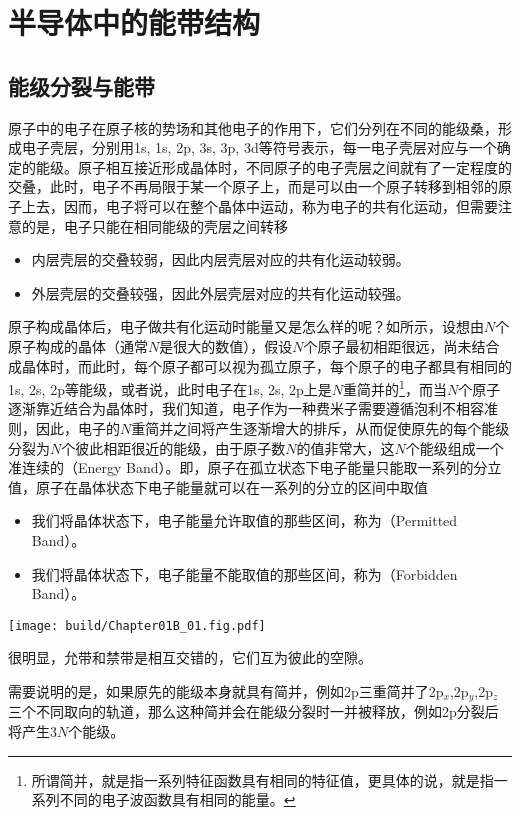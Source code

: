 \section{半导体中的能带结构}

\subsection{能级分裂与能带}
原子中的电子在原子核的势场和其他电子的作用下，它们分列在不同的能级桑，形成电子壳层，分别用1s, 1s, 2p, 3s, 3p, 3d等符号表示，每一电子壳层对应与一个确定的能级。原子相互接近形成晶体时，不同原子的电子壳层之间就有了一定程度的交叠，此时，电子不再局限于某一个原子上，而是可以由一个原子转移到相邻的原子上去，因而，电子将可以在整个晶体中运动，称为电子的共有化运动，但需要注意的是，电子只能在相同能级的壳层之间转移
\begin{itemize}
    \item 内层壳层的交叠较弱，因此内层壳层对应的共有化运动较弱。
    \item 外层壳层的交叠较强，因此外层壳层对应的共有化运动较强。
\end{itemize}
原子构成晶体后，电子做共有化运动时能量又是怎么样的呢？如所示，设想由$N$个原子构成的晶体（通常$N$是很大的数值），假设$N$个原子最初相距很远，尚未结合成晶体时，而此时，每个原子都可以视为孤立原子，每个原子的电子都具有相同的1s, 2s, 2p等能级，或者说，此时电子在1s, 2s, 2p上是$N$重简并的\footnote{所谓简并，就是指一系列特征函数具有相同的特征值，更具体的说，就是指一系列不同的电子波函数具有相同的能量。}，而当$N$个原子逐渐靠近结合为晶体时，我们知道，电子作为一种费米子需要遵循泡利不相容准则，因此，电子的$N$重简并之间将产生逐渐增大的排斥，从而促使原先的每个能级分裂为$N$个彼此相距很近的能级，由于原子数$N$的值非常大，这$N$个能级组成一个准连续的（Energy Band）。即，原子在孤立状态下电子能量只能取一系列的分立值，原子在晶体状态下电子能量就可以在一系列的分立的区间中取值
\begin{itemize}
    \item 我们将晶体状态下，电子能量允许取值的那些区间，称为（Permitted Band）。
    \item 我们将晶体状态下，电子能量不能取值的那些区间，称为（Forbidden Band）。
\end{itemize}
\begin{Figure}[能级分裂与能带]
    \texttt{[image: build/Chapter01B\_01.fig.pdf]}
\end{Figure}
很明显，允带和禁带是相互交错的，它们互为彼此的空隙。

需要说明的是，如果原先的能级本身就具有简并，例如2p三重简并了2p$_x$,2p$_y$,2p$_z$三个不同取向的轨道，那么这种简并会在能级分裂时一并被释放，例如2p分裂后将产生$3N$个能级。

